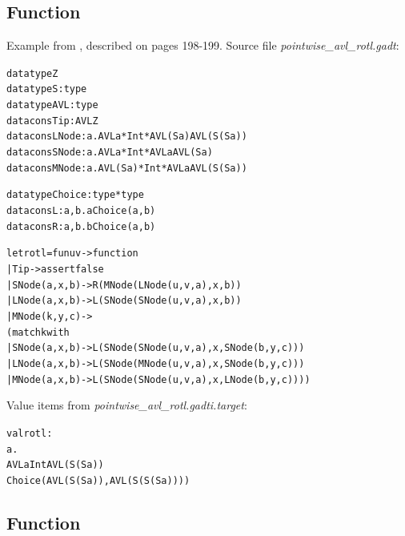 \documentclass{article}
\newcommand{\tmem}[1]{{\em #1\/}}
\newcommand{\tmverbatim}[1]{{\ttfamily{#1}}}
\newenvironment{tmcode}[1][]{\begin{alltt}}{\end{alltt}}
\begin{document}
\subsection{Function \tmverbatim{rotl}}

Example from {\cite{PracticalGADTsInfer}}, described on pages 198-199. Source
file {\tmem{pointwise\_avl\_rotl.gadt}}:
\begin{tmcode}
datatype Z
datatype S : type
datatype AVL : type
datacons Tip : AVL Z
datacons LNode : a. AVL a * Int * AVL (S a)  AVL (S (S a))
datacons SNode : a. AVL a * Int * AVL a  AVL (S a)
datacons MNode : a. AVL (S a) * Int * AVL a  AVL (S (S a))

datatype Choice : type * type
datacons L : a, b. a  Choice (a, b)
datacons R : a, b. b  Choice (a, b)

let rotl = fun u v -> function
  | Tip -> assert false
  | SNode (a, x, b) -> R (MNode (LNode (u, v, a), x, b))
  | LNode (a, x, b) -> L (SNode (SNode (u, v, a), x, b))
  | MNode (k, y, c) ->
    (match k with
      | SNode (a, x, b) -> L (SNode (SNode (u, v, a), x, SNode (b, y, c)))
      | LNode (a, x, b) -> L (SNode (MNode (u, v, a), x, SNode (b, y, c)))
      | MNode (a, x, b) -> L (SNode (SNode (u, v, a), x, LNode (b, y, c))))
\end{tmcode}
Value items from {\tmem{pointwise\_avl\_rotl.gadti.target}}:
\begin{tmcode}
val rotl :
   a.
   AVL a  Int  AVL (S (S a)) 
     Choice (AVL (S (S a)), AVL (S (S (S a))))
\end{tmcode}

\subsection{Function \tmverbatim{ins}}
\end{document}

